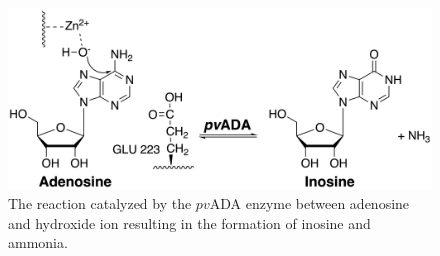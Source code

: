 \documentclass[journal=jpcbfk,manuscript=article,layout=traditional]{achemso}
\begin{document}
\begin{figure}
\includegraphics[width=\columnwidth]{figures/ada-reaction.png}
\caption{The reaction catalyzed by the $pv$ADA enzyme between adenosine and hydroxide ion
resulting in the formation of inosine and ammonia.}
\label{fig:ada-reaction}
\end{figure}
\end{document}
